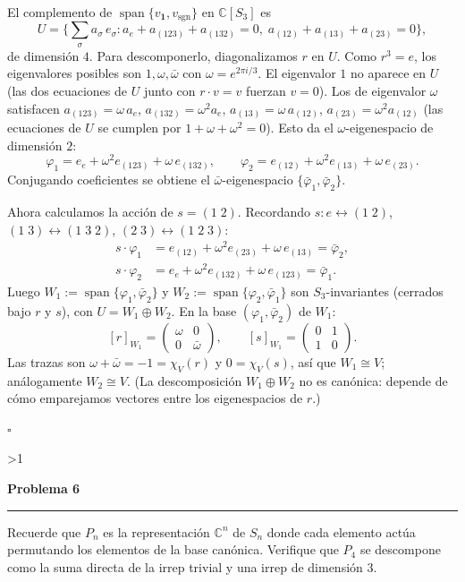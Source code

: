 \documentclass[10pt,a4paper]{article}
\newcommand{\CC}{\mathbb{C}}
\newcounter{probcnt}
\newcommand{\problem}[2]{%
  \stepcounter{probcnt}%
  \ifnum\value{probcnt}>1\newpage\fi
  \par\vspace{0.25em}
  {\large\bfseries\color{repblue} Problema #1}\par
  {\color{repline}\rule{\linewidth}{0.55pt}}\par
  \begin{tcolorbox}[
    breakable,
    colback=white,
    colframe=repline,
    borderline west={1.6pt}{0pt}{repteal},
    left=0.7em,
    right=0.7em,
    top=0.35em,
    bottom=0.3em,
    before skip=0.35em,
    after skip=0.45em
  ]
    #2
  \end{tcolorbox}
}
\begin{document}
El complemento de $\operatorname{span}\{v_{\mathbf 1},
v_{\operatorname{sgn}}\}$ en $\CC[S_3]$ es
\[
  U=\bigl\{{\textstyle\sum_\sigma} a_\sigma\,e_\sigma :
    a_e+a_{(123)}+a_{(132)}=0,\;
    a_{(12)}+a_{(13)}+a_{(23)}=0\bigr\},
\]
de dimensión $4$.
Para descomponerlo, diagonalizamos $r$ en $U$.
Como $r^3=e$, los eigenvalores posibles son $1,\omega,\bar\omega$
con $\omega=e^{2\pi i/3}$.
El eigenvalor $1$ no aparece en $U$
(las dos ecuaciones de $U$ junto con $r\cdot v=v$ fuerzan $v=0$).
Los de eigenvalor $\omega$ satisfacen $a_{(123)}=\omega\,a_e$,
$a_{(132)}=\omega^2 a_e$, $a_{(13)}=\omega\,a_{(12)}$,
$a_{(23)}=\omega^2 a_{(12)}$
(las ecuaciones de $U$ se cumplen por $1+\omega+\omega^2=0$).
Esto da el $\omega$-eigenespacio de dimensión $2$:
\[
  \varphi_1=e_e+\omega^2 e_{(123)}+\omega\,e_{(132)},
  \qquad
  \varphi_2=e_{(12)}+\omega^2 e_{(13)}+\omega\,e_{(23)}.
\]
Conjugando coeficientes se obtiene el $\bar\omega$-eigenespacio
$\{\bar\varphi_1,\bar\varphi_2\}$.

Ahora calculamos la acción de $s=(1\;2)$. Recordando
$s\colon e\leftrightarrow(1\;2)$,
$(1\;3)\leftrightarrow(1\;3\;2)$,
$(2\;3)\leftrightarrow(1\;2\;3)$:
\begin{align*}
  s\cdot\varphi_1
    &= e_{(12)}+\omega^2 e_{(23)}+\omega\,e_{(13)}
    = \bar\varphi_2,\\
  s\cdot\varphi_2
    &= e_e+\omega^2 e_{(132)}+\omega\,e_{(123)}
    = \bar\varphi_1.
\end{align*}
Luego $W_1:=\operatorname{span}\{\varphi_1,\bar\varphi_2\}$ y
$W_2:=\operatorname{span}\{\varphi_2,\bar\varphi_1\}$ son
$S_3$-invariantes (cerrados bajo $r$ y $s$), con $U=W_1\oplus W_2$.
En la base $(\varphi_1,\bar\varphi_2)$ de $W_1$:
\[
  [r]_{W_1}=\begin{pmatrix}\omega&0\\0&\bar\omega\end{pmatrix},
  \qquad
  [s]_{W_1}=\begin{pmatrix}0&1\\1&0\end{pmatrix}.
\]
Las trazas son $\omega+\bar\omega=-1=\chi_V(r)$ y $0=\chi_V(s)$,
así que $W_1\cong V$; análogamente $W_2\cong V$.
(La descomposición $W_1\oplus W_2$ no es canónica: depende de cómo
emparejamos vectores entre los eigenespacios de $r$.)

\hfill$\square$
\endgroup

\problem{6}{%
Recuerde que $P_n$ es la representación $\CC^n$ de $S_n$ donde cada
elemento actúa permutando los elementos de la base canónica. Verifique
que $P_4$ se descompone como la suma directa de la irrep trivial y una
irrep de dimensión $3$.
}
\end{document}
